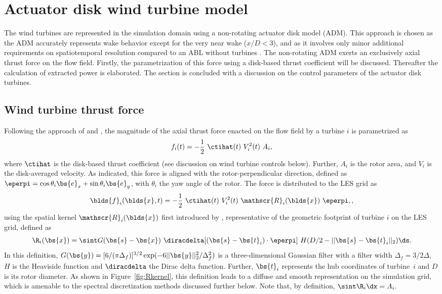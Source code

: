 \section{Actuator disk wind turbine model}\label{sec:meth_adm}
The wind turbines are represented in the simulation domain using a non-rotating actuator disk model (ADM). This approach is chosen as the ADM accurately represents wake behavior except for the very near wake ($x/D < 3$), and as it involves only minor additional requirements on spatiotemporal resolution compared to an ABL without turbines \citep{mikkelsen2003actuator, wu2015modeling}. The non-rotating ADM exerts an exclusively axial thrust force on the flow field. Firstly, the parametrization of this force using a disk-based thrust coefficient will be discussed. Thereafter the calculation of extracted power is elaborated. The section is concluded with a discussion on the control parameters of the actuator disk turbines.

\subsection{Wind turbine thrust force}
Following the approach of \cite{meyers2010large} and \cite{calaf2010large}, the magnitude of the axial thrust force enacted on the flow field by a turbine $i$ is parametrized as 
\begin{equation}
f_i(t) = - \frac{1}{2}~\ctihat(t)~V_{i}^2(t)~A_i,
\end{equation}
where $\ctihat$ is the disk-based thrust coefficient (see discussion on wind turbine controls below). Further, $A_i$ is the rotor area, and $V_i$ is the disk-averaged velocity. As indicated, this force is aligned with the rotor-perpendicular direction, defined as $\eperpi =  \cos \theta_i \bs{e}_x + \sin \theta_i \bs{e}_y $, with $\theta_i$ the yaw angle of the rotor. The force is distributed to the LES grid as 
\begin{equation}
\blds{f}_i(\blds{x},t) = - \frac{1}{2}~\ctihat(t)~V_{i}^2(t)~\mathscr{R}_i(\blds{x})~\eperpi,\label{eq:define_force}, 
\end{equation}
using the spatial kernel $\mathscr{R}_i (\blds{x})$ first introduced by \cite{meyers2010large}, representative of the geometric footprint of turbine $i$ on the LES grid, defined as 
\begin{equation}
\R_i(\bs{x}) = \sint G(\bs{s}-\bs{x}) ~ \diracdelta [(\bs{s}-\bs{t}_i)\cdot\eperpi] ~ H(D/2-\vert\vert \bs{s}-\bs{t}_i\vert\vert_2) \ds \label{eq:R}.
\end{equation} 
In this definition, $G(\bs{y}) = [6/(\pi \Delta_f)]^{3/2} \exp(-6\vert\vert \bs{y}\vert\vert_2^2/\Delta_f^2)$ is a three-dimensional Gaussian filter with a filter width $\Delta_f = 3/2\Delta$, $H$ is the Heaviside function and $\diracdelta$ the Dirac delta function. Further, $\bs{t}_i$ represents the hub coordinates of turbine~$i$ and $D$ is its rotor diameter. As shown in Figure~\ref{fig:Rkernel}, this definition leads to a diffuse and smooth representation on the simulation grid, which is amenable to the spectral discretization methods discussed further below. Note that, by definition, $\sint \R_i \dx = A_i$.

